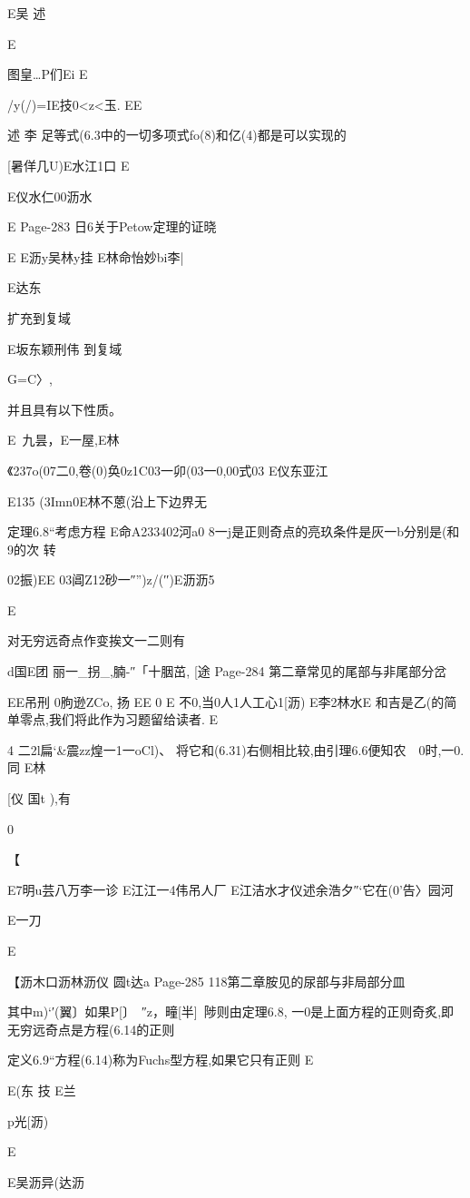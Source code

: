 {{{{{{{{{{{{{{E吴
述

E

图皇…P们Ei
E

/y(/)=IE技0<z<玉.
EE

述
李
足等式(6.3中的一切多项式fo(8)和亿(4)都是可以实现的

[暑佯几U)E水江1口
E

E仪水仁00沥水

E
Page-283
日6关于Petow定理的证晓

E
E沥y吴林y挂
E林命怡妙bi李|

E达东

扩充到复域

E坂东颖刑伟
到复域

G=C〉,

并且具有以下性质。

E~九昙，E一屋,E林

《237o(07二0,卷(0)奂0z1C03一卯(03一0,00式03
E仪东亚江

E135
(3Imn0E林不蒽(沿上下边界无

定理6.8“考虑方程
E命A233402河a0
8一j是正则奇点的亮玖条件是灰一b分别是(和9的次
转

02振)EE
03阊Z12砂一″”)z/(′′)E沥沥5

E

对无穷远奇点作变挨文一二则有

d国E团
丽一_拐_,腩-″「十胭茁,
[途
Page-284
第二章常见的尾部与非尾部分岔

EE吊刑
0朐逊ZCo,
扬
EE
0
E
不0,当0人1人工心1[沥)
E李2林水E
和吉是乙(的简单零点,我们将此作为习题留给读者.
E

4
二2l扁`&震zz煌一1一oCl)、
将它和(6.31)右侧相比较,由引理6.6便知农~~0时,一0.同
E林

[仪
国t
),有

0

【

E7明u芸八万李一诊
E江江一4伟吊人厂
E江洁水才仪述余浩夕″`它在(0'告〉园河

E一刀

E

【沥木口沥林沥仪
圆t达a
Page-285
118第二章胺见的尿部与非局部分皿

其中m)`′(翼〕如果P[〕~″z，疃[半]~陟则由定理6.8,
一0是上面方程的正则奇炙,即无穷远奇点是方程(6.14的正则

定义6.9“方程(6.14)称为Fuchs型方程,如果它只有正则
E

E(东
技
E兰

p光[沥)

E

E吴沥异(达沥

}}}}}}}}}}}}}}
